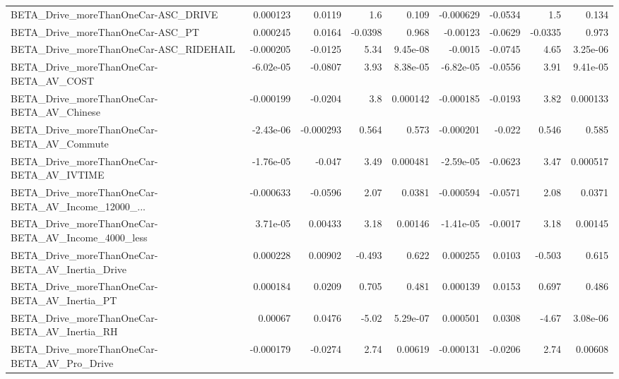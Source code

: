 \begin{tabular}{lrrrrrrrr}
BETA\_Drive\_moreThanOneCar-ASC\_DRIVE                &    0.000123 &       0.0119 &      1.6 &    0.109 &  -0.000629 &     -0.0534 &          1.5 &         0.134 \\
BETA\_Drive\_moreThanOneCar-ASC\_PT                   &    0.000245 &       0.0164 &  -0.0398 &    0.968 &   -0.00123 &     -0.0629 &      -0.0335 &         0.973 \\
BETA\_Drive\_moreThanOneCar-ASC\_RIDEHAIL             &   -0.000205 &      -0.0125 &     5.34 & 9.45e-08 &    -0.0015 &     -0.0745 &         4.65 &      3.25e-06 \\
BETA\_Drive\_moreThanOneCar-BETA\_AV\_COST             &   -6.02e-05 &      -0.0807 &     3.93 & 8.38e-05 &  -6.82e-05 &     -0.0556 &         3.91 &      9.41e-05 \\
BETA\_Drive\_moreThanOneCar-BETA\_AV\_Chinese          &   -0.000199 &      -0.0204 &      3.8 & 0.000142 &  -0.000185 &     -0.0193 &         3.82 &      0.000133 \\
BETA\_Drive\_moreThanOneCar-BETA\_AV\_Commute          &   -2.43e-06 &    -0.000293 &    0.564 &    0.573 &  -0.000201 &      -0.022 &        0.546 &         0.585 \\
BETA\_Drive\_moreThanOneCar-BETA\_AV\_IVTIME           &   -1.76e-05 &       -0.047 &     3.49 & 0.000481 &  -2.59e-05 &     -0.0623 &         3.47 &      0.000517 \\
BETA\_Drive\_moreThanOneCar-BETA\_AV\_Income\_12000\_... &   -0.000633 &      -0.0596 &     2.07 &   0.0381 &  -0.000594 &     -0.0571 &         2.08 &        0.0371 \\
BETA\_Drive\_moreThanOneCar-BETA\_AV\_Income\_4000\_less &    3.71e-05 &      0.00433 &     3.18 &  0.00146 &  -1.41e-05 &     -0.0017 &         3.18 &       0.00145 \\
BETA\_Drive\_moreThanOneCar-BETA\_AV\_Inertia\_Drive    &    0.000228 &      0.00902 &   -0.493 &    0.622 &   0.000255 &      0.0103 &       -0.503 &         0.615 \\
BETA\_Drive\_moreThanOneCar-BETA\_AV\_Inertia\_PT       &    0.000184 &       0.0209 &    0.705 &    0.481 &   0.000139 &      0.0153 &        0.697 &         0.486 \\
BETA\_Drive\_moreThanOneCar-BETA\_AV\_Inertia\_RH       &     0.00067 &       0.0476 &    -5.02 & 5.29e-07 &   0.000501 &      0.0308 &        -4.67 &      3.08e-06 \\
BETA\_Drive\_moreThanOneCar-BETA\_AV\_Pro\_Drive        &   -0.000179 &      -0.0274 &     2.74 &  0.00619 &  -0.000131 &     -0.0206 &         2.74 &       0.00608 \\

\end{tabular}
